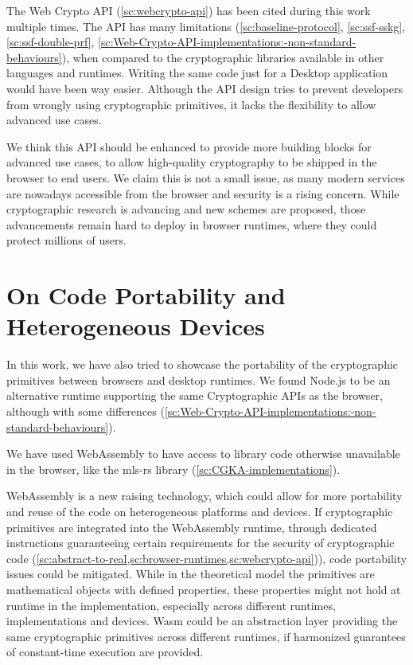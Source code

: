The Web Crypto API (\cref{sc:webcrypto-api})
has been cited during this work
multiple times. 
The API has many limitations 
(\cref{sc:baseline-protocol}, \cref{sc:ssf-sskg}, \cref{sc:ssf-double-prf}, \cref{sc:Web-Crypto-API-implementations:-non-standard-behaviours}),
when compared to the cryptographic libraries available
in other languages and runtimes.
Writing the same code just for a Desktop application
would have been way easier.
Although the API design tries to prevent developers from
wrongly using cryptographic primitives, it lacks
the flexibility to allow advanced use cases.

We think this API should
be enhanced to provide more building blocks
for advanced use cases, to allow high-quality
cryptography to be shipped in the browser to
end users. We claim this is not a small issue,
as many modern services are nowadays accessible
from the browser and security is a rising concern.
While cryptographic research is advancing and new
schemes are proposed, those advancements remain hard to
deploy in browser runtimes, where they could 
protect millions of users.

\section{On Code Portability and Heterogeneous Devices}\label{sc:gap-code-portability}

In this work, we have also tried to showcase the
portability of the cryptographic primitives
between browsers and desktop runtimes.
We found Node.js to be an alternative runtime supporting
the same Cryptographic APIs as the browser, although
with some differences (\cref{sc:Web-Crypto-API-implementations:-non-standard-behaviours}).

We have used WebAssembly to have access to
library code otherwise unavailable
in the browser, like the mls-rs library
(\cref{sc:CGKA-implementations}). 

WebAssembly is a new raising technology, which could
allow for more portability and reuse of the code on
heterogeneous platforms and devices. 
If cryptographic primitives
are integrated into the WebAssembly runtime,
through dedicated instructions guaranteeing
certain requirements for the security of cryptographic
code (\cref{sc:abstract-to-real,sc:browser-runtimes,sc:webcrypto-api})),
code portability issues could be mitigated.
While in the theoretical model the primitives are
mathematical objects with defined properties,
these properties might not hold at runtime in the
implementation, especially across different runtimes,
implementations and devices.
Wasm could be an abstraction layer providing the
same cryptographic primitives across different
runtimes, if harmonized guarantees of constant-time
execution are provided.

